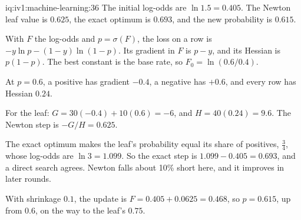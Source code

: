 \begin{solution}{iq:iv1:machine-learning:36}
The initial log-odds are $\ln 1.5 = 0.405$. The Newton leaf value is $0.625$, the exact optimum is $0.693$, and the new probability is $0.615$.

With $F$ the log-odds and $p = \sigma(F)$, the loss on a row is $-y\ln p - (1 - y)\ln(1 - p)$. Its gradient in $F$ is $p - y$, and its Hessian is $p(1 - p)$. The best constant is the base rate, so $F_0 = \ln(0.6/0.4)$.

At $p = 0.6$, a positive has gradient $-0.4$, a negative has $+0.6$, and every row has Hessian $0.24$.

For the leaf: $G = 30(-0.4) + 10(0.6) = -6$, and $H = 40(0.24) = 9.6$. The Newton step is $-G/H = 0.625$.

The exact optimum makes the leaf's probability equal its share of positives, $\frac34$, whose log-odds are $\ln 3 = 1.099$. So the exact step is $1.099 - 0.405 = 0.693$, and a direct search agrees. Newton falls about 10\% short here, and it improves in later rounds.

With shrinkage $0.1$, the update is $F = 0.405 + 0.0625 = 0.468$, so $p = 0.615$, up from $0.6$, on the way to the leaf's $0.75$.



\end{solution}

